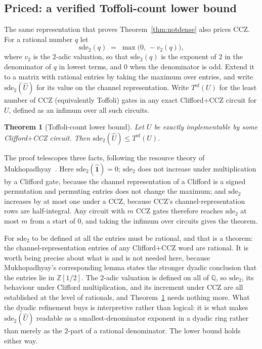 \documentclass[aps,pra,reprint,nofootinbib,superscriptaddress]{revtex4-2}
\theoremstyle{plain}
\newtheorem{theorem}{Theorem}
\theoremstyle{definition}
\begin{document}
\subsection{Priced: a verified Toffoli-count lower bound}
\label{sec:resource}

The same representation that proves Theorem~\ref{thm:notdense} also prices CCZ.
For a rational number $q$ let
\[
  \mathrm{sde}_2(q) \;=\; \max\big(0,\, -v_2(q)\big),
\]
where $v_2$ is the $2$-adic valuation, so that $\mathrm{sde}_2(q)$ is the
exponent of $2$ in the denominator of $q$ in lowest terms, and $0$ when the
denominator is odd. Extend it to a matrix with rational entries by taking the
maximum over entries, and write $\mathrm{sde}_2(\widehat U)$ for its value on
the channel representation. Write $T^{\mathrm{of}}(U)$ for the least number of
CCZ (equivalently Toffoli) gates in any exact Clifford$+$CCZ circuit for $U$,
defined as an infimum over all such circuits.

\begin{theorem}[Toffoli-count lower bound]
\label{thm:toffoli}
Let $U$ be exactly implementable by some Clifford$+$CCZ circuit. Then
$\mathrm{sde}_2(\widehat U) \le T^{\mathrm{of}}(U)$.
\end{theorem}

The proof telescopes three facts, following the resource theory of
Mukhopadhyay~\cite[Theorem~3.8, Fact~3.9 and Lemma~3.16]{Mukhopadhyay2024}.
Here $\mathrm{sde}_2(\widehat{\mathbf 1}) = 0$;
$\mathrm{sde}_2$ does not increase under multiplication by a Clifford gate,
because the channel representation of a Clifford is a signed permutation and
permuting entries does not change the maximum; and $\mathrm{sde}_2$ increases
by at most one under a CCZ, because CCZ's channel-representation rows are
half-integral. Any circuit with $m$ CCZ gates therefore reaches
$\mathrm{sde}_2$ at most $m$ from a start of $0$, and taking the infimum over
circuits gives the theorem.

For $\mathrm{sde}_2$ to be defined at all the entries must be rational, and
that is a theorem: the channel-representation entries of any Clifford$+$CCZ
word are rational. It is worth being precise about what is and is not needed
here, because Mukhopadhyay's corresponding lemma states the stronger dyadic
conclusion that the entries lie in $\mathbb Z[1/2]$. The $2$-adic valuation is
defined on all of $\mathbb Q$, so $\mathrm{sde}_2$, its behaviour under
Clifford multiplication, and its increment under CCZ are all established at the
level of rationals, and Theorem~\ref{thm:toffoli} needs nothing more. What the
dyadic refinement buys is interpretive rather than logical: it is what makes
$\mathrm{sde}_2(\widehat U)$ readable as a smallest-denominator exponent in a
dyadic ring rather than merely as the $2$-part of a rational denominator. The
lower bound holds either way.
\end{document}

